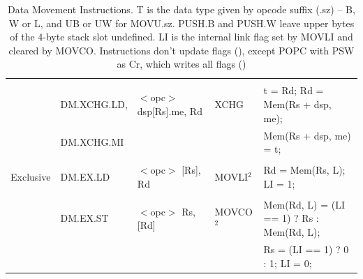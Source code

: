 \begin{table}
\begin{center}
\begin{tabular}{lllll}
                   &                   &                                       &                   &                                                                               \\
                   & DM.XCHG.LD,       & $<$opc$>$ dsp[Rs].me, Rd              & XCHG              & t = Rd; Rd = Mem(Rs + dsp, me);                                               \\
                   & DM.XCHG.MI        &                                       &                   & Mem(Rs + dsp, me) = t;                                                        \\
                   &                   &                                       &                   &                                                                               \\
Exclusive          & DM.EX.LD          & $<$opc$>$ [Rs], Rd                    & MOVLI$^{2}$       & Rd = Mem(Rs, L); LI = 1;                                                      \\
                   &                   &                                       &                   &                                                                               \\
                   & DM.EX.ST          & $<$opc$>$ Rs, [Rd]                    & MOVCO$^{2}$       & Mem(Rd, L) = (LI == 1) ? Rs : Mem(Rd, L);                                     \\
                   &                   &                                       &                   & Rs = (LI == 1) ? 0 : 1; LI = 0;                                               \\ \hline
\end{tabular}
\end{center}
\captionsetup{font=scriptsize, labelfont=scriptsize}
\caption{Data Movement Instructions. T is the data type given by opcode suffix (.sz) -- B, W or L, and UB or UW 
for MOVU.sz. PUSH.B and PUSH.W leave upper bytes of the 4-byte stack slot undefined. LI is the internal link 
flag set by MOVLI and cleared by MOVCO. Instructions don't update flags (\flags{----}), except POPC with PSW as
Cr, which writes all flags (\flags{!!!!})}
\end{table}


